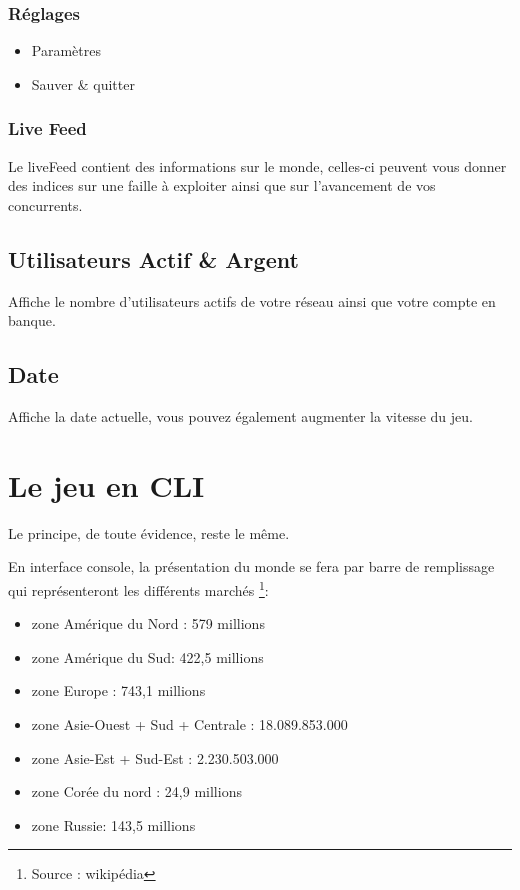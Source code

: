\subsubsection{Réglages}
\begin{itemize}
            \item Paramètres
            \item Sauver \& quitter
\end{itemize}
\subsubsection{Live Feed}
Le liveFeed contient des informations sur le monde, celles-ci peuvent vous donner des indices sur une faille à exploiter ainsi que sur l'avancement de vos concurrents.
\subsection{Utilisateurs Actif \& Argent}
Affiche le nombre d'utilisateurs actifs de votre réseau ainsi que votre compte en banque.
\subsection{Date}
Affiche la date actuelle, vous pouvez également augmenter la vitesse du jeu.

\section{Le jeu en CLI}
Le principe, de toute évidence, reste le même.

En interface console, la présentation du monde se fera par barre de remplissage qui représenteront les différents marchés \footnote{Source : wikipédia}: 
    \begin{itemize}
                \item zone Amérique du Nord : 579 millions
                \item zone Amérique du Sud: 422,5 millions
                \item zone Europe : 743,1 millions 
                \item zone Asie-Ouest + Sud + Centrale : 18.089.853.000
                \item zone Asie-Est + Sud-Est : 2.230.503.000
                \item zone Corée du nord : 24,9 millions 
                \item zone Russie: 143,5 millions 
    \end{itemize}


